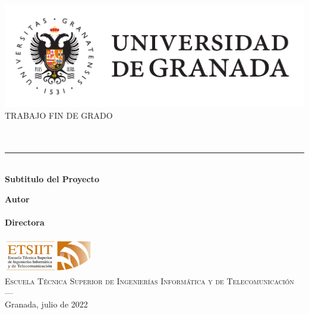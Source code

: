 \begin{titlepage}
 
 
\newlength{\centeroffset}
\setlength{\centeroffset}{-0.5\oddsidemargin}
\addtolength{\centeroffset}{0.5\evensidemargin}
\thispagestyle{empty}

\noindent\hspace*{\centeroffset}\begin{minipage}{\textwidth}

\centering
\includegraphics[width=\textwidth]{imagenes/logo_ugr.pdf}\\[1.4cm]

\textsc{ \Large TRABAJO FIN DE GRADO\\[0.2cm]}
\textsc{ \myDegree }\\[1cm]
% 
{\Huge\bfseries \myTitle \\
}
\noindent\rule[-1ex]{\textwidth}{3pt}\\[3.5ex]
{\large\bfseries Subtitulo del Proyecto}
\end{minipage}

\vspace{2.5cm}
\noindent\hspace*{\centeroffset}\begin{minipage}{\textwidth}
\centering

\textbf{Autor}\\ {\myName }\\[2.5ex]
\textbf{Directora}\\
{\myProf}\\[1cm]
\includegraphics[width=0.3\textwidth]{imagenes/etsiit_logo.png}\\[0.1cm]
\textsc{Escuela Técnica Superior de Ingenierías Informática y de Telecomunicación}\\
\textsc{---}\\
Granada, julio de 2022
\end{minipage}
\end{titlepage}


